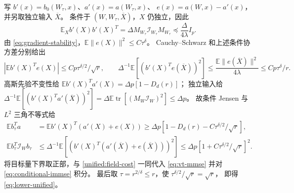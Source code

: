 \documentclass[a4paper]{tufte-handout}
\newcommand{\E}{\mathbb E}
\DeclareMathOperator{\tr}{tr}
\begin{document}
\begin{fullwidth}
写 $b'(x)=b_0(W_\tau,x)$、$a'(x)=a(W_\tau,x)$、
$e(x)=a(W,x)-a'(x)$，并另取独立输入 $\overline X$。
条件于 $(W,W_\tau,\overline X)$，$X$ 仍独立，因此
\[
 \E_Xb'(X)b'(X)^T=\Delta M_{W_\tau}\mathcal I_{W_\tau}M_{W_\tau}
 \preceq\frac{\Delta}{4\lambda}I_p.
\]
由 \eqref{eq:gradient-stability}，$\E\|e(X)\|^2\le C\tau^\delta$。
Cauchy--Schwarz 和上述条件协方差分别给出
\[
 |\E b'(X)^Te(X)|\le Cp\tau^{\delta/2}/\sqrt r,
 \qquad
 \Delta^{-1}\E[(b'(X)^Te(\overline X))^2]
 \le\frac{\E\|e(\overline X)\|^2}{4\lambda}\le Cp\tau^\delta/r.
\]
高斯先验不变性给 $\E b'(X)^Ta'(X)=\Delta p[1-D_d(r)]$；
独立输入给
$\Delta^{-1}\E[(b'(X)^Ta'(\overline X))^2]
 =\Delta\E\tr[(M_W\mathcal I_W)^2]\le\Delta p$。
故条件 Jensen 与 $L^2$ 三角不等式给
\begin{equation}\label{field:target}\begin{aligned}
 \E b_\tau^Ta&=\E b'(X)^T(a'(X)+e(X))
 \ge\Delta p[1-D_d(r)-C\tau^{\delta/2}/\sqrt r],\\
 \E b_\tau^T\mathcal I_Wb_\tau
 &\le\Delta^{-1}\E[(b'(X)^T(a'(\overline X)+e(\overline X)))^2]
 \le\Delta p[1+C\tau^{\delta/2}/\sqrt r]^2.
\end{aligned}\end{equation}
将目标量下界取正部，与 \eqref{unified:field-cost} 一同代入
\eqref{eq:vt-mmse} 并对 \eqref{eq:conditional-immse} 积分。
最后取 $\tau=r^{2/\delta}\le r$，使 $\tau^{\delta/2}/\sqrt r=\sqrt r$，
即得 \eqref{eq:lower-unified}。

\end{fullwidth}
\end{document}

